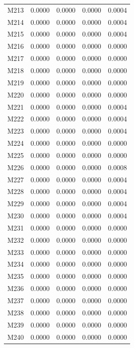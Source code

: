 \begin{longtable}{lrrrr}
M213 & 0.0000 & 0.0000 & 0.0000 & 0.0004 \\
M214 & 0.0000 & 0.0000 & 0.0000 & 0.0004 \\
M215 & 0.0000 & 0.0000 & 0.0000 & 0.0004 \\
M216 & 0.0000 & 0.0000 & 0.0000 & 0.0000 \\
M217 & 0.0000 & 0.0000 & 0.0000 & 0.0000 \\
M218 & 0.0000 & 0.0000 & 0.0000 & 0.0000 \\
M219 & 0.0000 & 0.0000 & 0.0000 & 0.0000 \\
M220 & 0.0000 & 0.0000 & 0.0000 & 0.0000 \\
M221 & 0.0000 & 0.0000 & 0.0000 & 0.0004 \\
M222 & 0.0000 & 0.0000 & 0.0000 & 0.0004 \\
M223 & 0.0000 & 0.0000 & 0.0000 & 0.0004 \\
M224 & 0.0000 & 0.0000 & 0.0000 & 0.0000 \\
M225 & 0.0000 & 0.0000 & 0.0000 & 0.0000 \\
M226 & 0.0000 & 0.0000 & 0.0000 & 0.0008 \\
M227 & 0.0000 & 0.0000 & 0.0000 & 0.0004 \\
M228 & 0.0000 & 0.0000 & 0.0000 & 0.0004 \\
M229 & 0.0000 & 0.0000 & 0.0000 & 0.0004 \\
M230 & 0.0000 & 0.0000 & 0.0000 & 0.0004 \\
M231 & 0.0000 & 0.0000 & 0.0000 & 0.0000 \\
M232 & 0.0000 & 0.0000 & 0.0000 & 0.0000 \\
M233 & 0.0000 & 0.0000 & 0.0000 & 0.0000 \\
M234 & 0.0000 & 0.0000 & 0.0000 & 0.0000 \\
M235 & 0.0000 & 0.0000 & 0.0000 & 0.0000 \\
M236 & 0.0000 & 0.0000 & 0.0000 & 0.0000 \\
M237 & 0.0000 & 0.0000 & 0.0000 & 0.0000 \\
M238 & 0.0000 & 0.0000 & 0.0000 & 0.0000 \\
M239 & 0.0000 & 0.0000 & 0.0000 & 0.0000 \\
M240 & 0.0000 & 0.0000 & 0.0000 & 0.0000 \\
\end{longtable}
